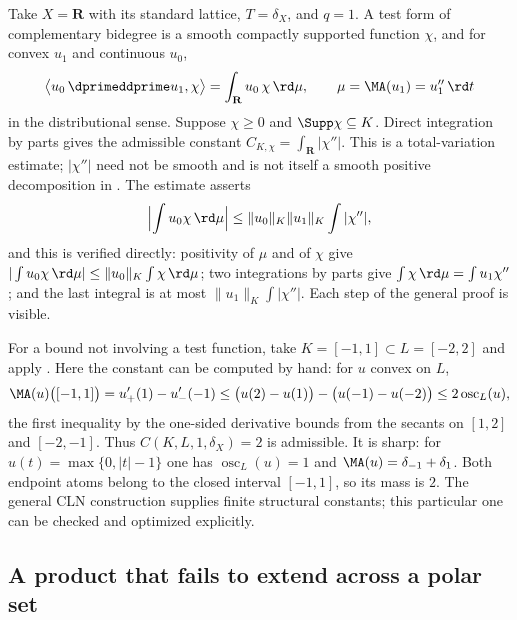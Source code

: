 \begin{example}
\label{ex:ch16-cln-verified}
Take $X=\mathbf R$ with its standard lattice, $T=\delta_X$, and $q=1$.  A
test form of complementary bidegree is a smooth compactly supported
function $\chi$, and for convex $u_1$ and continuous $u_0$,
\[
 \bigl\langle u_0\,\dprimeddprime u_1,\chi\bigr\rangle
 =\int_{\mathbf R}u_0\,\chi\,\rd\mu,
 \qquad \mu=\MA(u_1)=u_1''\,\rd t
\]
in the distributional sense.  Suppose $\chi\geq0$ and $\Supp\chi\subseteq K$.
Direct integration by parts gives the admissible constant
$C_{K,\chi}=\int_{\mathbf R}|\chi''|$.  This is a total-variation estimate;
$|\chi''|$ need not be smooth and is not itself a smooth positive
decomposition in .  The estimate asserts
\[
 \Bigl|\int u_0\chi\,\rd\mu\Bigr|
 \leq\|u_0\|_K\|u_1\|_K\int|\chi''| ,
\]
and this is verified directly: positivity of $\mu$ and of $\chi$ give
$|\int u_0\chi\,\rd\mu|\leq\|u_0\|_K\int\chi\,\rd\mu$; two integrations by
parts give $\int\chi\,\rd\mu=\int u_1\chi''$; and the last integral is at
most $\|u_1\|_K\int|\chi''|$.  Each step of the general proof is visible.

For a bound not involving a test function, take
$K=[-1,1]\subset L=[-2,2]$ and apply
.  Here the constant can be computed by hand:
for $u$ convex on $L$,
\[
 \MA(u)\bigl([-1,1]\bigr)=u'_+(1)-u'_-(-1)
 \leq\bigl(u(2)-u(1)\bigr)-\bigl(u(-1)-u(-2)\bigr)
 \leq2\operatorname{osc}_L(u),
\]
the first inequality by the one-sided derivative bounds from the secants
on $[1,2]$ and $[-2,-1]$.  Thus $C(K,L,1,\delta_X)=2$ is admissible.
It is sharp: for $u(t)=\max\{0,|t|-1\}$ one has
$\operatorname{osc}_L(u)=1$ and
$\MA(u)=\delta_{-1}+\delta_1$.  Both endpoint atoms belong to the closed
interval $[-1,1]$, so its mass is $2$.  The general CLN construction
supplies finite structural constants; this particular one can be checked
and optimized explicitly.
\end{example}

\subsection{A product that fails to extend across a polar set}
\label{sec:ch16-worked-polar}

